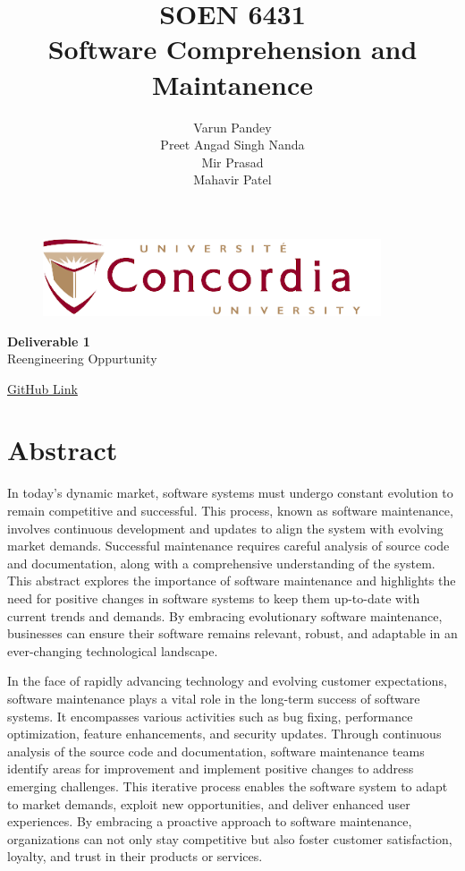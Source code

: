 \documentclass[12pt,english]{article}
\title{\textbf{SOEN 6431 \\ Software Comprehension and Maintanence}}
\author{Varun Pandey \\ Preet Angad Singh Nanda \\ Mir Prasad \\ Mahavir Patel }
\date{}
\begin{document}
\begin{figure}
    \centering
    \includegraphics[width=10cm]{concordia.png}
\end{figure}
    
\maketitle
\vspace{3cm}
\begin{center}
    \huge{\textbf{Deliverable 1} \\ Reengineering Oppurtunity}
\end{center}

\vspace{3cm}


\begin{center}
    \href{https://github.com/mahavir0/DEJA-VU---SOEN-6431-SCM}{\Large{GitHub Link}}
\end{center}


\newpage

\tableofcontents

\newpage

\section{Abstract}
In today's dynamic market, software systems must undergo constant evolution to remain competitive and successful. This process, known as software maintenance, involves continuous development and updates to align the system with evolving market demands. Successful maintenance requires careful analysis of source code and documentation, along with a comprehensive understanding of the system. This abstract explores the importance of software maintenance and highlights the need for positive changes in software systems to keep them up-to-date with current trends and demands. By embracing evolutionary software maintenance, businesses can ensure their software remains relevant, robust, and adaptable in an ever-changing technological landscape.

\vspace{0.5cm}

In the face of rapidly advancing technology and evolving customer expectations, software maintenance plays a vital role in the long-term success of software systems. It encompasses various activities such as bug fixing, performance optimization, feature enhancements, and security updates. Through continuous analysis of the source code and documentation, software maintenance teams identify areas for improvement and implement positive changes to address emerging challenges. This iterative process enables the software system to adapt to market demands, exploit new opportunities, and deliver enhanced user experiences. By embracing a proactive approach to software maintenance, organizations can not only stay competitive but also foster customer satisfaction, loyalty, and trust in their products or services.
\end{document}
